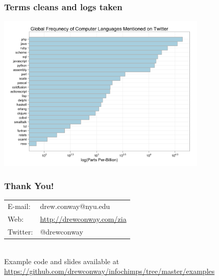 \documentclass[xcolor=dvipsnames, 9pt]{beamer}
\begin{document}
\begin{frame}[fragile]
    \frametitle{Terms cleans and logs taken}
    \includegraphics[width=10cm]{images/lang_pop3.png}
\end{frame}


\begin{frame}[fragile]
    \frametitle{Thank You!}
    \begin{tabular}{ll}
        E-mail: & drew.conway@nyu.edu \\
        Web:    & \url{http://drewconway.com/zia} \\
        Twitter:& @drewconway
    \end{tabular}
    \vspace{2cm} \\
    Example code and slides available at \url{https://github.com/drewconway/infochimps/tree/master/examples}
\end{frame}
\end{document}
